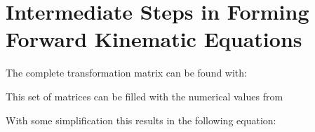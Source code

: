 \chapter{Intermediate Steps in Forming Forward Kinematic Equations} \label{sec:FWKinEqSteps}
The complete transformation matrix can be found with:



This set of matrices can be filled with the numerical values from 



With some simplification this results in the following equation:

